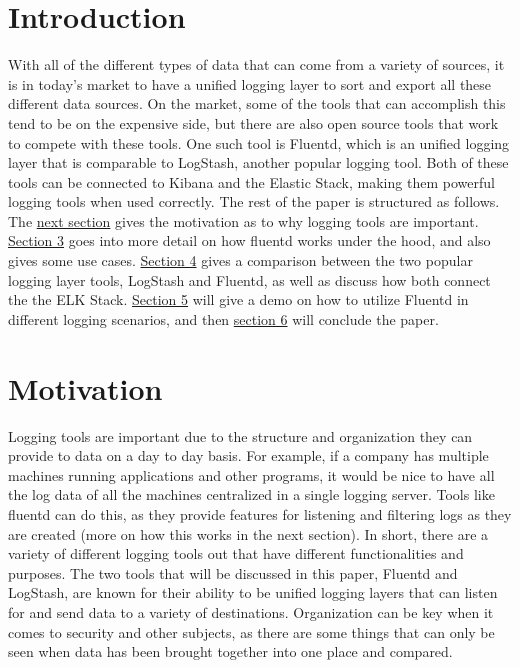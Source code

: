 \section{Introduction} \label{sec: intro}
\quad \quad 
With all of the different types of data that can come from a variety of sources, it is in today's market
to have a unified logging layer to sort and export all these different data sources. On the market, some
of the tools that can accomplish this tend to be on the expensive side, but there are also open source tools that
work to compete with these tools. One such tool is Fluentd, which is an unified logging layer that is comparable to
LogStash, another popular logging tool. Both of these tools can be connected to Kibana and the Elastic Stack, 
making them powerful logging tools when used correctly. The rest of the paper is structured as follows. The 
\hyperref[sec:motiv]{next section} gives the motivation as to why logging tools are important. 
\hyperref[sec:works]{Section 3} goes into more detail on how fluentd works under the hood, and also gives some
use cases. \hyperref[sec:comp]{Section 4} gives a comparison between the two popular logging layer tools, LogStash 
and Fluentd, as well as discuss how both connect the the ELK Stack. \hyperref[sec:demo]{Section 5} will give a demo on how to 
utilize Fluentd in different logging scenarios, and then \hyperref[sec:conclude]{section 6} will conclude the paper.
\section{Motivation} \label{sec:motiv}
\quad \quad 
Logging tools are important due to the structure and organization they can provide to data on a day to 
day basis. For example, if a company has multiple machines running applications and other programs, it would be nice 
to have all the log data of all the machines centralized in a single logging server. Tools like fluentd can do this, as 
they provide features for listening and filtering logs as they are created (more on how this works in the next section). 
In short, there are a variety of different logging tools out that have different functionalities and purposes. The two tools
that will be discussed in this paper, Fluentd and LogStash, are known for their ability to be unified logging layers that can
listen for and send data to a variety of destinations. Organization can be key when it comes to security and other subjects,
as there are some things that can only be seen when data has been brought together into one place and compared.
